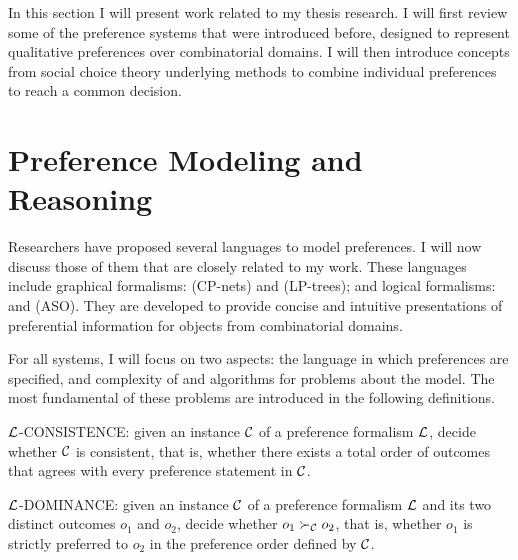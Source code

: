 
In this section I will present work related to my thesis research.
I will first review some of the preference
systems that were introduced before, designed to represent
qualitative preferences over combinatorial domains. 
I will then introduce concepts
from social choice theory underlying methods to
combine individual preferences to reach a common decision.

\section{Preference Modeling and Reasoning \label{sec:pref_reasoning}}
Researchers have proposed several languages to model preferences.
I will now discuss those of them that are closely related
to my work.
These languages include graphical formalisms:
 (CP-nets) and
 (LP-trees);
and logical formalisms:
 and
 (ASO).
They are developed to provide concise and intuitive
presentations of preferential information for objects from
combinatorial domains.

For all systems, I will focus on two aspects:
the language in which preferences are specified,
and complexity of and algorithms for
problems about the model.
The most fundamental of these problems are introduced
in the following definitions.

\begin{definition}
\label{def:con}
  $\mathcal{L}$-CONSISTENCE: given an instance $\mathcal{C}$ of a preference
	formalism $\mathcal{L}$, decide whether $\mathcal{C}$ is consistent, that is,
  whether there exists a total order of outcomes that agrees with every
	preference statement in $\mathcal{C}$.
\end{definition}

\begin{definition}
\label{def:dom}
  $\mathcal{L}$-DOMINANCE: given an instance $\mathcal{C}$ of a preference
	formalism $\mathcal{L}$ and its two distinct outcomes
  $o_1$ and $o_2$, decide whether $o_1 \succ_{\mathcal{C}} o_2$, that is,
  whether $o_1$ is strictly preferred to $o_2$ in 
	the preference order defined by $\mathcal{C}$.
\end{definition}

